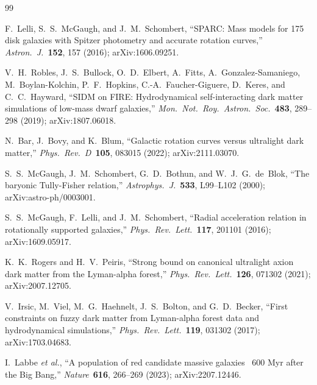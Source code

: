 \documentclass[11pt,a4paper]{article}
\theoremstyle{definition}
\theoremstyle{remark}
\begin{document}
\begin{thebibliography}{99}

F.~Lelli, S.~S.~McGaugh, and J.~M.~Schombert,
``SPARC: Mass models for 175 disk galaxies with Spitzer photometry and accurate rotation curves,''
\emph{Astron.\ J.}\ \textbf{152}, 157 (2016);
arXiv:1606.09251.

V.~H.~Robles, J.~S.~Bullock, O.~D.~Elbert, A.~Fitts, A.~Gonzalez-Samaniego, M.~Boylan-Kolchin, P.~F.~Hopkins, C.-A.~Faucher-Giguere, D.~Keres, and C.~C.~Hayward,
``SIDM on FIRE: Hydrodynamical self-interacting dark matter simulations of low-mass dwarf galaxies,''
\emph{Mon.\ Not.\ Roy.\ Astron.\ Soc.}\ \textbf{483}, 289--298 (2019);
arXiv:1807.06018.

N.~Bar, J.~Bovy, and K.~Blum,
``Galactic rotation curves versus ultralight dark matter,''
\emph{Phys.\ Rev.\ D}\ \textbf{105}, 083015 (2022);
arXiv:2111.03070.


S.~S.~McGaugh, J.~M.~Schombert, G.~D.~Bothun, and W.~J.~G.~de~Blok,
``The baryonic Tully-Fisher relation,''
\emph{Astrophys.\ J.}\ \textbf{533}, L99--L102 (2000);
arXiv:astro-ph/0003001.

S.~S.~McGaugh, F.~Lelli, and J.~M.~Schombert,
``Radial acceleration relation in rotationally supported galaxies,''
\emph{Phys.\ Rev.\ Lett.}\ \textbf{117}, 201101 (2016);
arXiv:1609.05917.


K.~K.~Rogers and H.~V.~Peiris,
``Strong bound on canonical ultralight axion dark matter from the Lyman-alpha forest,''
\emph{Phys.\ Rev.\ Lett.}\ \textbf{126}, 071302 (2021);
arXiv:2007.12705.

V.~Irsic, M.~Viel, M.~G.~Haehnelt, J.~S.~Bolton, and G.~D.~Becker,
``First constraints on fuzzy dark matter from Lyman-alpha forest data and hydrodynamical simulations,''
\emph{Phys.\ Rev.\ Lett.}\ \textbf{119}, 031302 (2017);
arXiv:1703.04683.


I.~Labbe \emph{et al.},
``A population of red candidate massive galaxies ~600 Myr after the Big Bang,''
\emph{Nature}\ \textbf{616}, 266--269 (2023);
arXiv:2207.12446.

\end{thebibliography}
\end{document}
